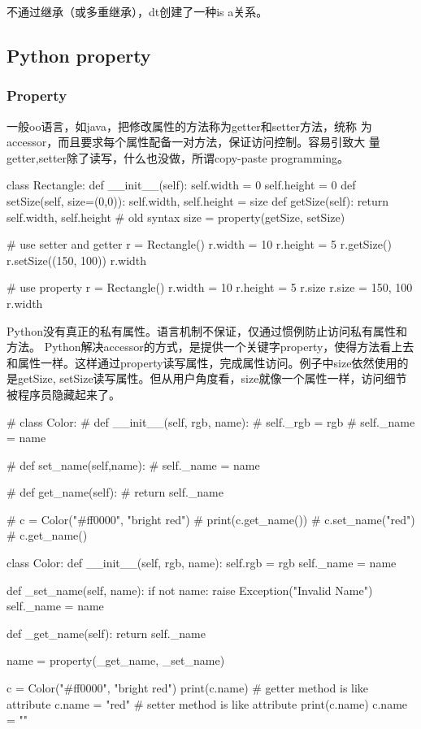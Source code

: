 不通过继承（或多重继承），dt创建了一种is a关系。

\subsection{Python property}

\subsubsection{Property}
一般oo语言，如java，把修改属性的方法称为getter和setter方法，统称
为accessor，而且要求每个属性配备一对方法，保证访问控制。容易引致大
量getter,setter除了读写，什么也没做，所谓copy-paste programming。
\begin{python}
class Rectangle:
    def __init__(self):
        self.width = 0
        self.height = 0
    def setSize(self, size=(0,0)):
        self.width, self.height = size
    def getSize(self):
        return self.width, self.height
# old syntax
    size = property(getSize, setSize)

# use setter and getter
r = Rectangle()
r.width = 10
r.height = 5
r.getSize()
r.setSize((150, 100))
r.width

# use property
r = Rectangle()
r.width = 10
r.height = 5
r.size
r.size = 150, 100
r.width
\end{python}

Python没有真正的私有属性。语言机制不保证，仅通过惯例防止访问私有属性和方法。
Python解决accessor的方式，是提供一个关键字property，使得方法看上去和属性一样。这样通过property读写属性，完成属性访问。例子中size依然使用的是getSize, setSize读写属性。但从用户角度看，size就像一个属性一样，访问细节被程序员隐藏起来了。

\begin{python}
# class Color:
#     def __init__(self, rgb, name):
#         self._rgb = rgb
#         self._name = name

#     def set_name(self,name):
#         self._name = name

#     def get_name(self):
#         return self._name

# c = Color("#ff0000", "bright red")
# print(c.get_name())
# c.set_name("red")
# c.get_name()

class Color:
    def __init__(self, rgb, name):
        self.rgb = rgb
        self._name = name

    def _set_name(self, name):
        if not name:
            raise Exception("Invalid Name")
        self._name = name

    def _get_name(self):
        return self._name

    name = property(_get_name, _set_name)

c = Color("#ff0000", "bright red")
print(c.name)    # getter method is like attribute
c.name = "red"   # setter method is like attribute
print(c.name)
c.name = ""
\end{python}

